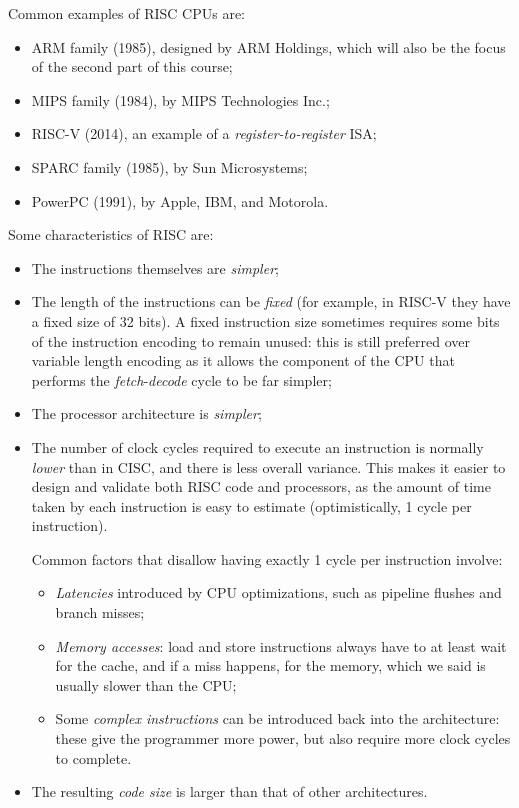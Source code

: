 \documentclass[a4paper,11pt]{article}
\begin{document}
Common examples of RISC CPUs are:
\begin{itemize}
	\item ARM family (1985), designed by ARM Holdings, which will also be the focus of the second part of this course;
	\item MIPS family (1984), by MIPS Technologies Inc.;
	\item RISC-V (2014), an example of a \textit{register-to-register} ISA;
	\item SPARC family (1985), by Sun Microsystems;
	\item PowerPC (1991), by Apple, IBM, and Motorola.
\end{itemize}

Some characteristics of RISC are:
\begin{itemize}
	\item The instructions themselves are \textit{simpler};
	\item The length of the instructions can be \textit{fixed} (for example, in RISC-V they have a fixed size of 32 bits). A fixed instruction size sometimes requires some bits of the instruction encoding to remain unused: this is still preferred over variable length encoding as it allows the component of the CPU that performs the \textit{fetch}-\textit{decode} cycle to be far simpler;
	\item The processor architecture is \textit{simpler};
	\item The number of clock cycles required to execute an instruction is normally \textit{lower} than in CISC, and there is less overall variance. This makes it easier to design and validate both RISC code and processors, as the amount of time taken by each instruction is easy to estimate (optimistically, 1 cycle per instruction).

		Common factors that disallow having exactly 1 cycle per instruction involve:
		\begin{itemize}
			\item \textit{Latencies} introduced by CPU optimizations, such as pipeline flushes and branch misses;
			\item \textit{Memory accesses}: load and store instructions always have to at least wait for the cache, and if a miss happens, for the memory, which we said is usually slower than the CPU;
			\item Some \textit{complex instructions} can be introduced back into the architecture: these give the programmer more power, but also require more clock cycles to complete.
		\end{itemize}
	\item The resulting \textit{code size} is larger than that of other architectures.
\end{itemize}
\end{document}
